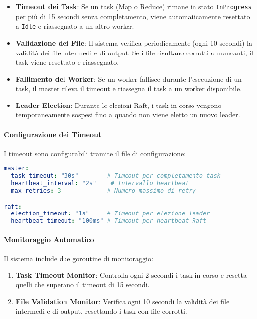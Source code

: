 \documentclass[12pt,a4paper]{article}
\begin{document}
\begin{itemize}
\item \textbf{Timeout dei Task}: Se un task (Map o Reduce) rimane in stato \texttt{InProgress} per più di 15 secondi senza completamento, viene automaticamente resettato a \texttt{Idle} e riassegnato a un altro worker.

\item \textbf{Validazione dei File}: Il sistema verifica periodicamente (ogni 10 secondi) la validità dei file intermedi e di output. Se i file risultano corrotti o mancanti, il task viene resettato e riassegnato.

\item \textbf{Fallimento del Worker}: Se un worker fallisce durante l'esecuzione di un task, il master rileva il timeout e riassegna il task a un worker disponibile.

\item \textbf{Leader Election}: Durante le elezioni Raft, i task in corso vengono temporaneamente sospesi fino a quando non viene eletto un nuovo leader.
\end{itemize}

\paragraph{Configurazione dei Timeout}
I timeout sono configurabili tramite il file di configurazione:

\begin{lstlisting}[language=yaml, caption=Configurazione timeout nel file config.yaml]
master:
  task_timeout: "30s"        # Timeout per completamento task
  heartbeat_interval: "2s"    # Intervallo heartbeat
  max_retries: 3             # Numero massimo di retry

raft:
  election_timeout: "1s"     # Timeout per elezione leader
  heartbeat_timeout: "100ms" # Timeout per heartbeat Raft
\end{lstlisting}

\paragraph{Monitoraggio Automatico}
Il sistema include due goroutine di monitoraggio:

\begin{enumerate}
\item \textbf{Task Timeout Monitor}: Controlla ogni 2 secondi i task in corso e resetta quelli che superano il timeout di 15 secondi.

\item \textbf{File Validation Monitor}: Verifica ogni 10 secondi la validità dei file intermedi e di output, resettando i task con file corrotti.
\end{enumerate}
\end{document}
